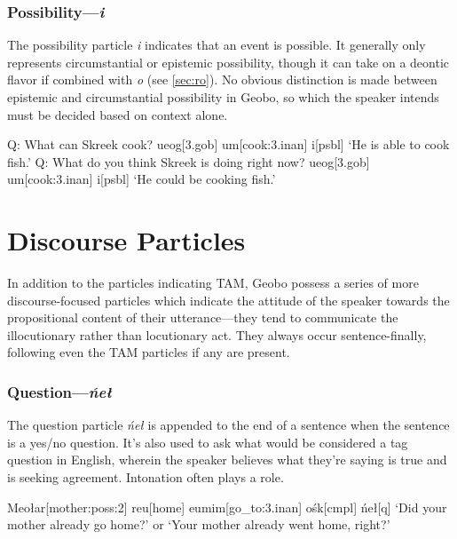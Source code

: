 \documentclass[a4paper,11pt,oneside,openany]{memoir}
\begin{document}


\subsubsection{Possibility---\textit{\vz i}}

The possibility particle \textit{\vz i} indicates that an event is possible. It generally only represents circumstantial or epistemic possibility, though it can take on a deontic flavor if combined with \textit{\vr o} (see \ref{sec:ro}). No obvious distinction is made between epistemic and circumstantial possibility in Geobo{\engma}, so which the speaker intends must be decided based on context alone.

\pex 
\a
\begingl
\glpreamble
Q: What can Skreek cook?
\endpreamble
{}
\Engma u\vz[fish]
eog[\sc 3.gob]
\vr um[cook:{\sc 3.inan}]
\vz i[\sc psbl]
\glft \phantom{A: }`He is able to cook fish.'
\endgl
\a 
\begingl
\glpreamble
Q: What do you think Skreek is doing right now?
\endpreamble
{}
\Engma u\vz[fish]
eog[\sc 3.gob]
\vr um[cook:{\sc 3.inan}]
\vz i[\sc psbl]
\glft \phantom{A: }`He could be cooking fish.'
\endgl
\xe

\section{Discourse Particles}

In addition to the particles indicating TAM, Geobo{\engma} possess a series of more discourse-focused particles which indicate the attitude of the speaker towards the propositional content of their utterance---they tend to communicate the illocutionary rather than locutionary act. They always occur sentence-finally, following even the TAM particles if any are present.

\subsubsection{Question---\textit{\'ne\l}}

The question particle \textit{\'ne\l} is appended to the end of a sentence when the sentence is a yes/no question. It's also used to ask what would be considered a tag question in English, wherein the speaker believes what they're saying is true and is seeking agreement. Intonation often plays a role.

\ex
\begingl
Meo\l ar[mother:{\sc poss:2}]
reu[home]
eumim[go\_to:{\sc 3.inan}]
o\'sk[\sc cmpl]
\'ne\l[\sc q]
\glft `Did your mother already go home?' or `Your mother already went home, right?'
\endgl 
\xe
\end{document}
